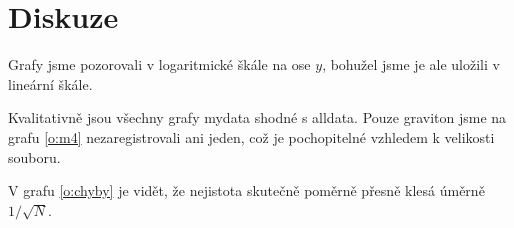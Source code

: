 \section*{Diskuze}
Grafy jsme pozorovali v logaritmické škále na ose $y$, bohužel jsme je ale uložili v lineární škále.

Kvalitativně jsou všechny grafy mydata shodné s alldata. Pouze graviton jsme na grafu \ref{o:m4} nezaregistrovali ani jeden, což je pochopitelné vzhledem k velikosti souboru.

V grafu \ref{o:chyby} je vidět, že nejistota skutečně poměrně přesně klesá úměrně $1/\sqrt{N}$.